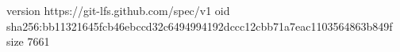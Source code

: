 version https://git-lfs.github.com/spec/v1
oid sha256:bb11321645fcb46ebccd32c6494994192dccc12cbb71a7eac1103564863b849f
size 7661
